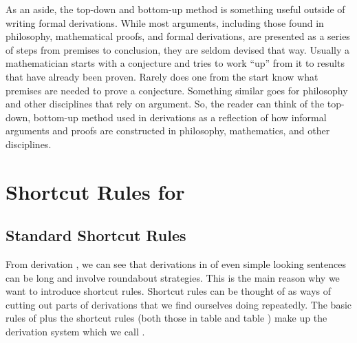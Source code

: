 As an aside, the top-down and bottom-up method is something useful outside of writing formal derivations. While most arguments, including those found in philosophy, mathematical proofs, and formal derivations, are presented as a series of steps from premises to conclusion, they are seldom devised that way. Usually a mathematician starts with a conjecture and tries to work ``up'' from it to results that have already been proven. Rarely does one from the start know what premises are needed to prove a conjecture. Something similar goes for philosophy and other disciplines that rely on argument. So, the reader can think of the top-down, bottom-up method used in derivations as a reflection of how informal arguments and proofs are constructed in philosophy, mathematics, and other disciplines.

\section{Shortcut Rules for \GSD{}}

\subsection{Standard Shortcut Rules}\label{Standard Shortcut Rules GSD}
From derivation , we can see that derivations in \GSD{} of even simple looking sentences can be long and involve roundabout strategies. 
This is the main reason why we want to introduce shortcut rules. 
Shortcut rules can be thought of as ways of cutting out parts of derivations that we find ourselves doing repeatedly. 
The basic rules of \GSD{} plus the shortcut rules (both those in table  and table ) make up the derivation system which we call \GSDP{}.

